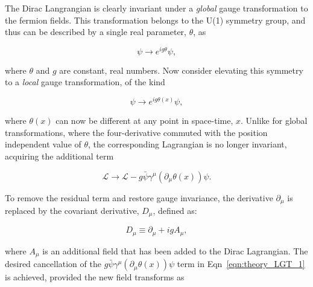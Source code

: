 The Dirac Langrangian is clearly invariant under a \textit{global} gauge transformation to the fermion fields. This transformation belongs to the U(1) symmetry group, and thus can be described by a single real parameter, ${\theta}$, as

\begin{equation}
    \psi \rightarrow e^{ig\theta}\psi,
\end{equation}

\noindent where ${\theta}$ and ${g}$ are constant, real numbers. Now consider elevating this symmetry to a \emph{local} gauge transformation, of the kind

\begin{equation}
    \psi \rightarrow e^{ig\theta(x)}\psi,
\end{equation}

\noindent where ${\theta(x)}$ can now be different at any point in space-time, ${x}$. Unlike for global transformations, where the four-derivative commuted with the position independent value of ${\theta}$, the corresponding Lagrangian is no longer invariant, acquiring the additional term

\begin{equation}
\label{eqn:theory_LGT_1}
    \mathcal{L} \rightarrow \mathcal{L} - g\bar{\psi}\gamma^{\mu}(\partial_{\mu}\theta(x))\psi.
\end{equation}


\noindent To remove the residual term and restore gauge invariance, the derivative ${\partial_\mu}$ is replaced by the covariant derivative, ${D_{\mu}}$, defined as:

\begin{equation}
    D_{\mu} \equiv \partial_{\mu} + igA_{\mu},
\end{equation}

\noindent where ${A_\mu}$ is an additional field that has been added to the Dirac Lagrangian. The desired cancellation of the ${g\bar{\psi}\gamma^{\mu}(\partial_{\mu}\theta(x))\psi}$ term in Eqn~\ref{eqn:theory_LGT_1} is achieved, provided the new field transforms as

